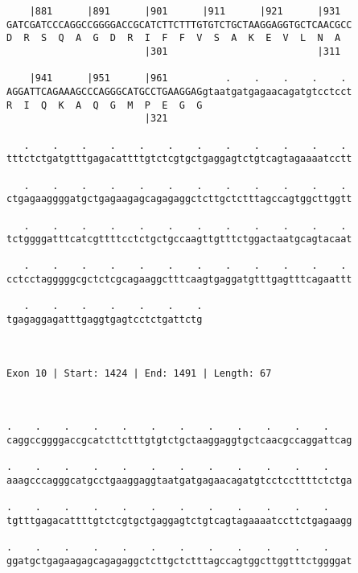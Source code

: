 \documentclass{article}
\begin{document}
\begin{Verbatim}
    |881      |891      |901      |911      |921      |931  
GATCGATCCCAGGCCGGGGACCGCATCTTCTTTGTGTCTGCTAAGGAGGTGCTCAACGCC
D  R  S  Q  A  G  D  R  I  F  F  V  S  A  K  E  V  L  N  A  
                        |301                          |311  
  
    |941      |951      |961          .    .    .    .    . 
AGGATTCAGAAAGCCCAGGGCATGCCTGAAGGAGgtaatgatgagaacagatgtcctcct
R  I  Q  K  A  Q  G  M  P  E  G  G                          
                        |321                                
  
   .    .    .    .    .    .    .    .    .    .    .    . 
tttctctgatgtttgagacattttgtctcgtgctgaggagtctgtcagtagaaaatcctt
                                                            
   .    .    .    .    .    .    .    .    .    .    .    . 
ctgagaaggggatgctgagaagagcagagaggctcttgctctttagccagtggcttggtt
                                                            
   .    .    .    .    .    .    .    .    .    .    .    . 
tctggggatttcatcgttttcctctgctgccaagttgtttctggactaatgcagtacaat
                                                            
   .    .    .    .    .    .    .    .    .    .    .    . 
cctcctagggggcgctctcgcagaaggctttcaagtgaggatgtttgagtttcagaattt
                                                            
   .    .    .    .    .    .    .
tgagaggagatttgaggtgagtcctctgattctg
                                  
                                  
 
Exon 10 | Start: 1424 | End: 1491 | Length: 67



.    .    .    .    .    .    .    .    .    .    .    .    
caggccggggaccgcatcttctttgtgtctgctaaggaggtgctcaacgccaggattcag
                                                            
.    .    .    .    .    .    .    .    .    .    .    .    
aaagcccagggcatgcctgaaggaggtaatgatgagaacagatgtcctccttttctctga
                                                            
.    .    .    .    .    .    .    .    .    .    .    .    
tgtttgagacattttgtctcgtgctgaggagtctgtcagtagaaaatccttctgagaagg
                                                            
.    .    .    .    .    .    .    .    .    .    .    .    
ggatgctgagaagagcagagaggctcttgctctttagccagtggcttggtttctggggat
                                                            

\end{Verbatim}
\end{document}
